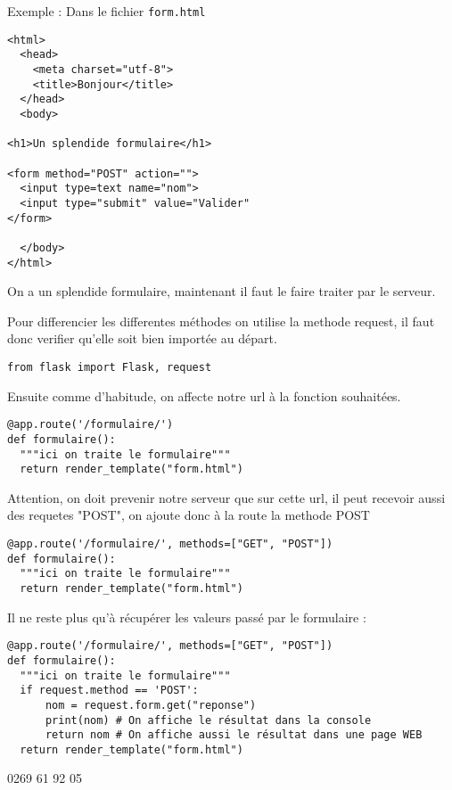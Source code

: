 \documentclass[12pt,a4paper]{article}
\begin{document}
Exemple : Dans le fichier \texttt{form.html}

\begin{verbatim}
<html>
  <head>
    <meta charset="utf-8">
    <title>Bonjour</title> 
  </head>
  <body>
    
<h1>Un splendide formulaire</h1>

<form method="POST" action="">
  <input type=text name="nom">
  <input type="submit" value="Valider"
</form>

  </body>
</html>
\end{verbatim}


On a un splendide formulaire, maintenant il faut le faire traiter par le serveur.

\par \vspace{5mm}

Pour differencier les differentes méthodes on utilise la methode request, il faut donc verifier qu'elle soit bien importée au départ.


\begin{verbatim}
from flask import Flask, request
\end{verbatim}

Ensuite comme d'habitude, on affecte notre url à la fonction souhaitées.

\begin{verbatim}
@app.route('/formulaire/')
def formulaire():
  """ici on traite le formulaire"""
  return render_template("form.html")
\end{verbatim}


Attention, on doit prevenir notre serveur que sur cette url, il peut recevoir aussi des requetes "POST", on ajoute donc à la route la methode POST


\begin{verbatim}
@app.route('/formulaire/', methods=["GET", "POST"])
def formulaire():
  """ici on traite le formulaire"""
  return render_template("form.html")
\end{verbatim}


Il ne reste plus qu'à récupérer les valeurs passé par le formulaire : 

\begin{verbatim}
@app.route('/formulaire/', methods=["GET", "POST"])
def formulaire():
  """ici on traite le formulaire"""
  if request.method == 'POST':
      nom = request.form.get("reponse")
      print(nom) # On affiche le résultat dans la console
      return nom # On affiche aussi le résultat dans une page WEB
  return render_template("form.html")
\end{verbatim}

0269 61 92 05
\end{document}
